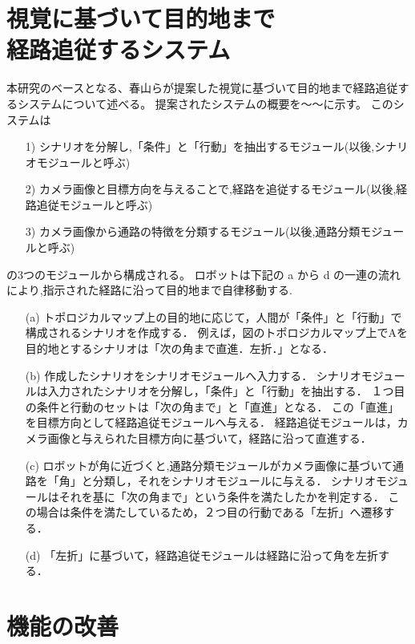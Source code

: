 \documentclass[10pt]{jarticle}
\begin{document}
    \section{視覚に基づいて目的地まで\\経路追従するシステム}
    本研究のベースとなる、春山らが提案した視覚に基づいて目的地まで経路追従するシステムについて述べる。
    提案されたシステムの概要を～～に示す。
    このシステムは
    \begin{enumerate}
        \item [1)]シナリオを分解し,「条件」と「行動」を抽出するモジュール(以後,シナリオモジュールと呼ぶ)
        \item [2)]カメラ画像と目標方向を与えることで,経路を追従するモジュール(以後,経路追従モジュールと呼ぶ)
        \item [3)]カメラ画像から通路の特徴を分類するモジュール(以後,通路分類モジュールと呼ぶ)
    \end{enumerate}
    の3つのモジュールから構成される。
    ロボットは下記の a から d の一連の流れにより,指示された経路に沿って目的地まで自律移動する.
    \begin{enumerate}
        \item [(a)] 
        トポロジカルマップ上の目的地に応じて，人間が「条件」と「行動」で構成されるシナリオを作成する．
        例えば，図のトポロジカルマップ上でAを目的地とするシナリオは「次の角まで直進．左折．」となる．
        \item [(b)] 
        作成したシナリオをシナリオモジュールへ入力する．
        シナリオモジュールは入力されたシナリオを分解し，「条件」と「行動」を抽出する．
        １つ目の条件と行動のセットは「次の角まで」と「直進」となる．
        この「直進」を目標方向として経路追従モジュールへ与える．
        経路追従モジュールは，カメラ画像と与えられた目標方向に基づいて，経路に沿って直進する．
        \item [(c)] 
        ロボットが角に近づくと,通路分類モジュールがカメラ画像に基づいて通路を「角」と分類し，それをシナリオモジュールに与える．
        シナリオモジュールはそれを基に「次の角まで」という条件を満たしたかを判定する．
        この場合は条件を満たしているため，２つ目の行動である「左折」へ遷移する．
        \item [(d)]「左折」に基づいて，経路追従モジュールは経路に沿って角を左折する．
    \end{enumerate}
    \section{機能の改善}%
\end{document}
